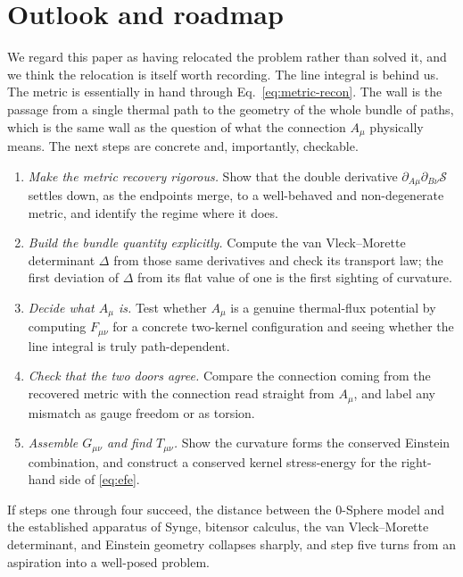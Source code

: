 \documentclass[%
 reprint, amsmath,amssymb, aps, prb, ]{revtex4-2}
\numberwithin{equation}{section}
\begin{document}
\section{Outlook and roadmap}
\label{sec:outlook}

We regard this paper as having relocated the problem rather than solved it, and we think the relocation is itself worth recording. The line integral is behind us. The metric is essentially in hand through Eq.~\eqref{eq:metric-recon}. The wall is the passage from a single thermal path to the geometry of the whole bundle of paths, which is the same wall as the question of what the connection $A_\mu$ physically means. The next steps are concrete and, importantly, checkable.

\begin{enumerate}[leftmargin=2em]
\item \emph{Make the metric recovery rigorous.} Show that the double derivative $\partial_{A\mu}\partial_{B\nu}\mathcal{S}$ settles down, as the endpoints merge, to a well-behaved and non-degenerate metric, and identify the regime where it does.
\item \emph{Build the bundle quantity explicitly.} Compute the van Vleck--Morette determinant $\Delta$ from those same derivatives and check its transport law; the first deviation of $\Delta$ from its flat value of one is the first sighting of curvature.
\item \emph{Decide what $A_\mu$ is.} Test whether $A_\mu$ is a genuine thermal-flux potential by computing $F_{\mu\nu}$ for a concrete two-kernel configuration and seeing whether the line integral is truly path-dependent.
\item \emph{Check that the two doors agree.} Compare the connection coming from the recovered metric with the connection read straight from $A_\mu$, and label any mismatch as gauge freedom or as torsion.
\item \emph{Assemble $G_{\mu\nu}$ and find $T_{\mu\nu}$.} Show the curvature forms the conserved Einstein combination, and construct a conserved kernel stress-energy for the right-hand side of \eqref{eq:efe}.
\end{enumerate}

If steps one through four succeed, the distance between the 0-Sphere model and the established apparatus of Synge, bitensor calculus, the van Vleck--Morette determinant, and Einstein geometry collapses sharply, and step five turns from an aspiration into a well-posed problem.
\end{document}
